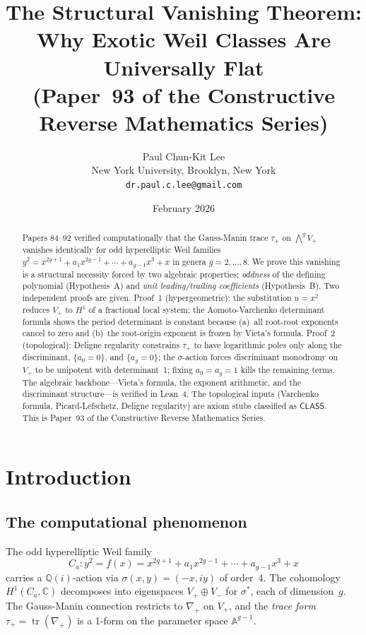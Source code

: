 \documentclass[11pt]{article}
\title{The Structural Vanishing Theorem:\\
Why Exotic Weil Classes Are Universally Flat\\[6pt]
\large (Paper~93 of the Constructive Reverse Mathematics Series)}
\author{Paul Chun-Kit Lee \\[2pt]
\normalsize New York University, Brooklyn, New York \\[2pt]
\normalsize \texttt{dr.paul.c.lee@gmail.com}}
\date{February 2026}
\theoremstyle{plain}
\theoremstyle{definition}
\theoremstyle{remark}
\newcommand{\QQ}{\mathbb{Q}}
\newcommand{\CC}{\mathbb{C}}
\newcommand{\tr}{\operatorname{tr}}
\newcommand{\CLASS}{\mathsf{CLASS}}
\begin{document}
\maketitle

\begin{abstract}
Papers 84--92 verified computationally that the Gauss-Manin trace
$\tau_+$ on $\bigwedge^g V_+$ vanishes identically for odd hyperelliptic
Weil families $y^2 = x^{2g+1} + a_1 x^{2g-1} + \cdots + a_{g-1}x^3 + x$
in genera $g = 2, \ldots, 8$.
We prove this vanishing is a structural necessity forced by two algebraic
properties: \emph{oddness} of the defining polynomial (Hypothesis~A)
and \emph{unit leading/trailing coefficients} (Hypothesis~B).
Two independent proofs are given.
Proof~1 (hypergeometric): the substitution $u = x^2$ reduces $V_+$ to
$H^1$ of a fractional local system; the Aomoto-Varchenko determinant
formula shows the period determinant is constant because
(a)~all root-root exponents cancel to zero and
(b)~the root-origin exponent is frozen by Vieta's formula.
Proof~2 (topological): Deligne regularity constrains $\tau_+$ to have
logarithmic poles only along the discriminant, $\{a_0 = 0\}$, and
$\{a_g = 0\}$; the $\sigma$-action forces discriminant monodromy on
$V_+$ to be unipotent with determinant~1; fixing $a_0 = a_g = 1$ kills
the remaining terms.
The algebraic backbone---Vieta's formula, the exponent arithmetic,
and the discriminant structure---is verified in Lean~4.
The topological inputs (Varchenko formula, Picard-Lefschetz, Deligne
regularity) are axiom stubs classified as $\CLASS$.
This is Paper~93 of the Constructive Reverse Mathematics Series.
\end{abstract}

\setcounter{tocdepth}{2}
\tableofcontents

\section{Introduction}\label{sec:intro}

\subsection{The computational phenomenon}

The odd hyperelliptic Weil family
\begin{equation}\label{eq:family}
  C_a : y^2 = f(x) = x^{2g+1} + a_1 x^{2g-1} + \cdots + a_{g-1} x^3 + x
\end{equation}
carries a $\QQ(i)$-action via $\sigma(x,y) = (-x, iy)$ of order~4.
The cohomology $H^1(C_a, \CC)$ decomposes into eigenspaces
$V_+ \oplus V_-$ for $\sigma^*$, each of dimension~$g$.
The Gauss-Manin connection restricts to $\nabla_+$ on $V_+$, and the
\emph{trace form} $\tau_+ = \tr(\nabla_+)$ is a 1-form on the
parameter space $\mathbb{A}^{g-1}$.
\end{document}

